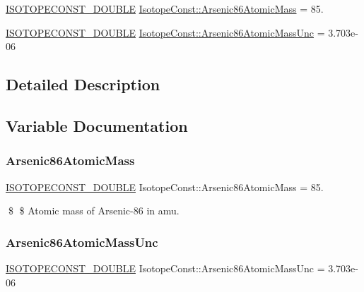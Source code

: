 \begin{DoxyCompactItemize}
\item 
\mbox{\hyperlink{group___isotope_const-_macros_ga8f45a7272ce02c0b4c65c44636ed719a}{I\+S\+O\+T\+O\+P\+E\+C\+O\+N\+S\+T\+\_\+\+D\+O\+U\+B\+LE}} \mbox{\hyperlink{group___isotope_const-_arsenic-_as86_ga4162fb67bea2fa89b5de17f7f2096516}{Isotope\+Const\+::\+Arsenic86\+Atomic\+Mass}} = 85.
\item 
\mbox{\hyperlink{group___isotope_const-_macros_ga8f45a7272ce02c0b4c65c44636ed719a}{I\+S\+O\+T\+O\+P\+E\+C\+O\+N\+S\+T\+\_\+\+D\+O\+U\+B\+LE}} \mbox{\hyperlink{group___isotope_const-_arsenic-_as86_ga3b60ec4856486ccf68bd5a5113fd38b4}{Isotope\+Const\+::\+Arsenic86\+Atomic\+Mass\+Unc}} = 3.\+703e-\/06
\end{DoxyCompactItemize}


\subsection{Detailed Description}


\subsection{Variable Documentation}
\mbox{\label{group___isotope_const-_arsenic-_as86_ga4162fb67bea2fa89b5de17f7f2096516}} 
\subsubsection{\texorpdfstring{Arsenic86\+Atomic\+Mass}{Arsenic86AtomicMass}}
{\footnotesize\ttfamily \mbox{\hyperlink{group___isotope_const-_macros_ga8f45a7272ce02c0b4c65c44636ed719a}{I\+S\+O\+T\+O\+P\+E\+C\+O\+N\+S\+T\+\_\+\+D\+O\+U\+B\+LE}} Isotope\+Const\+::\+Arsenic86\+Atomic\+Mass = 85.}

\$ \$ Atomic mass of Arsenic-\/86 in amu. \mbox{\label{group___isotope_const-_arsenic-_as86_ga3b60ec4856486ccf68bd5a5113fd38b4}} 
\subsubsection{\texorpdfstring{Arsenic86\+Atomic\+Mass\+Unc}{Arsenic86AtomicMassUnc}}
{\footnotesize\ttfamily \mbox{\hyperlink{group___isotope_const-_macros_ga8f45a7272ce02c0b4c65c44636ed719a}{I\+S\+O\+T\+O\+P\+E\+C\+O\+N\+S\+T\+\_\+\+D\+O\+U\+B\+LE}} Isotope\+Const\+::\+Arsenic86\+Atomic\+Mass\+Unc = 3.\+703e-\/06}

